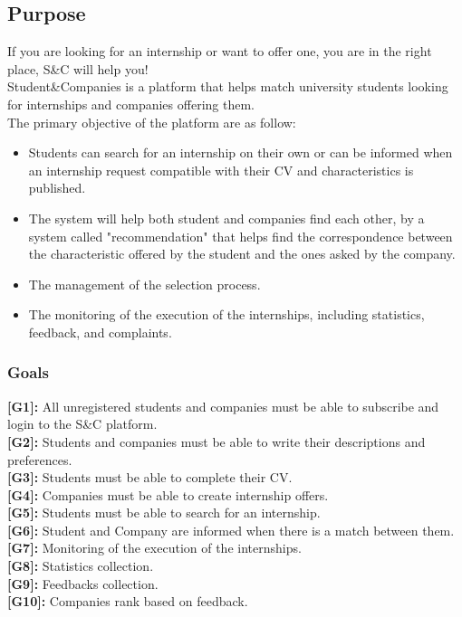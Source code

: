 \subsection{Purpose}
If you are looking for an internship or want to offer one, you are in the right place, S\&C will help you!\\
Student\&Companies is a platform that helps match university students looking for internships and companies offering them.\\
The primary objective of the platform are as follow:
\begin{itemize}
    \item Students can search for an internship on their own or can be informed when an internship request compatible with their CV and characteristics is published.
    \item The system will help both student and companies find each other, by a system called "recommendation" that helps find the correspondence between the characteristic offered by the student and the ones asked by the company.
    \item The management of the selection process. 
    \item The monitoring of the execution of the internships, including statistics, feedback, and complaints.
\end{itemize}
\subsubsection{Goals}
\textbf{[G1]:} All unregistered students and companies must be able to subscribe and login to the S\&C platform.\\
\textbf{[G2]:} Students and companies must be able to write their descriptions and preferences.\\
\textbf{[G3]:} Students must be able to complete their CV.\\
\textbf{[G4]:} Companies must be able to create internship offers.\\
\textbf{[G5]:} Students must be able to search for an internship.\\
\textbf{[G6]:} Student and Company are informed when there is a match between them.\\
\textbf{[G7]:} Monitoring of the execution of the internships.\\
\textbf{[G8]:} Statistics collection.\\
\textbf{[G9]:} Feedbacks collection.\\
\textbf{[G10]:} Companies rank based on feedback. 

